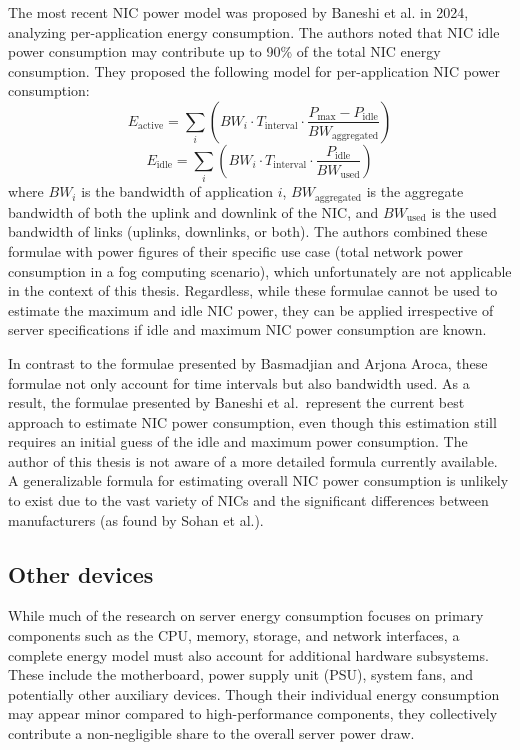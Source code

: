 The most recent NIC power model was proposed by Baneshi et al.\parencite{baneshiAnalyzingPerApplicationEnergy2024} in 2024, analyzing per-application energy consumption. The authors noted that NIC idle power consumption may contribute up to 90\% of the total NIC energy consumption. They proposed the following model for per-application NIC power consumption:
\begin{equation}
    E_{\text{active}} = \sum_{i} \left( BW_i \cdot T_{\text{interval}} \cdot \frac{P_{\text{max}} - P_{\text{idle}}}{BW_{\text{aggregated}}} \right)
\end{equation}
\begin{equation}
    E_{\text{idle}} = \sum_{i} \left( BW_i \cdot T_{\text{interval}} \cdot \frac{P_{\text{idle}}}{BW_{\text{used}}} \right)
\end{equation}
where $BW_i$ is the bandwidth of application $i$, $BW_{\text{aggregated}}$ is the aggregate bandwidth of both the uplink and downlink of the NIC, and $BW_{\text{used}}$ is the used bandwidth of links (uplinks, downlinks, or both). The authors combined these formulae with power figures of their specific use case (total network power consumption in a fog computing scenario), which unfortunately are not applicable in the context of this thesis. Regardless, while these formulae cannot be used to estimate the maximum and idle NIC power, they can be applied irrespective of server specifications if idle and maximum NIC power consumption are known.

In contrast to the formulae presented by Basmadjian and Arjona Aroca, these formulae not only account for time intervals but also bandwidth used. As a result, the formulae presented by Baneshi et al.\ represent the current best approach to estimate NIC power consumption, even though this estimation still requires an initial guess of the idle and maximum power consumption. The author of this thesis is not aware of a more detailed formula currently available. A generalizable formula for estimating overall NIC power consumption is unlikely to exist due to the vast variety of NICs and the significant differences between manufacturers (as found by Sohan et al.).

\subsection{Other devices}
While much of the research on server energy consumption focuses on primary components such as the CPU, memory, storage, and network interfaces, a complete energy model must also account for additional hardware subsystems. These include the motherboard, power supply unit (PSU), system fans, and potentially other auxiliary devices. Though their individual energy consumption may appear minor compared to high-performance components, they collectively contribute a non-negligible share to the overall server power draw.

